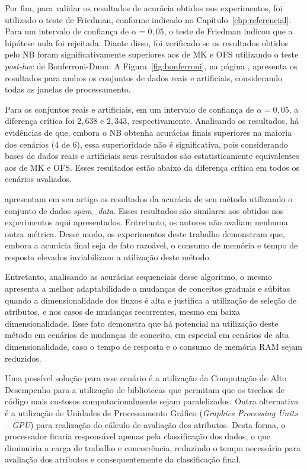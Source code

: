 Por fim, para validar os resultados de acurácia obtidos nos experimentos, foi utilizado o teste de Friedman, conforme indicado no Capítulo~\ref{chp:referencial}. Para um intervalo de confiança de $\alpha = 0,05$, o teste de Friedman indicou que a hipótese nula foi rejeitada. Diante disso, foi verificado se os resultados obtidos pelo NB foram significativamente superiores aos de MK e OFS utilizando o teste \textit{post-hoc} de Bonferroni-Dunn. A Figura~\ref{fig:bonferroni}, na página \pageref{fig:bonferroni}, apresenta os resultados para ambos os conjuntos de dados reais e artificiais, considerando todas as janelas de processamento.

Para os conjuntos reais e artificiais, em um intervalo de confiança de $\alpha=0,05$, a diferença crítica foi $2,638$ e $2,343$, respectivamente. Analisando os resultados, há evidências de que, embora o NB obtenha acurácias finais superiores na maioria dos cenários (4 de 6), essa superioridade não é significativa, pois considerando bases de dados reais e artificiais seus resultados são estatisticamente equivalentes aos de MK e OFS. Esses resultados estão abaixo da diferença crítica em todos os cenários avaliados. 

 apresentam em seu artigo os resultados da acurácia de seu método utilizando o conjunto de dados \textit{spam\_data}. Esses resultados são similares aos obtidos nos experimentos aqui apresentados. Entretanto, os autores não avaliam nenhuma outra métrica. Desse modo, os experimentos deste trabalho demonstram que, embora a acurácia final seja de fato razoável, o consumo de memória e tempo de resposta elevados inviabilizam a utilização deste método. 

Entretanto, analisando as acurácias sequenciais desse algoritmo, o mesmo apresenta a melhor adaptabilidade a mudanças de conceitos graduais e súbitas quando a dimensionalidade dos fluxos é alta e justifica a utilização de seleção de atributos, e nos casos de mudanças recorrentes, mesmo em baixa dimensionalidade. Esse fato demonstra que há potencial na utilização deste método em cenários de mudanças de conceito, em especial em cenários de alta dimensionalidade, caso o tempo de resposta e o consumo de memória RAM sejam reduzidos.

Uma possível solução para esse cenário é a utilização da Computação de Alto Desempenho para a utilização de bibliotecas que permitam que os trechos de código mais custosos computacionalmente sejam paralelizados. Outra alternativa é a utilização de Unidades de Processamento Gráfico (\textit{Graphics Processing Units -- GPU}) para realização do cálculo de avaliação dos atributos. Desta forma, o processador ficaria responsável apenas pela classificação dos dados, o que diminuiria a carga de trabalho e concorrência, reduzindo o tempo necessário para avaliação dos atributos e consequentemente da classificação final.

